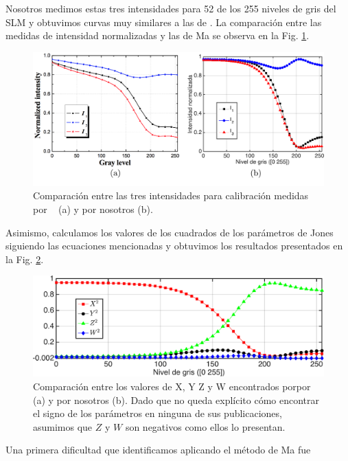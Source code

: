 Nosotros medimos estas tres intensidades para 52 de los 255 niveles de
gris del SLM y obtuvimos curvas muy similares a las de . La
comparación entre las medidas de intensidad normalizadas y las de Ma se observa en la
Fig. \ref{fig:Ma_and_our_Is}.
\begin{figure}[h!]
\includegraphics[scale = .27]{Ma_and_our_Is.pdf}
\caption[Comparación entre las tres intensidades para calibración
medidas por Ma et al.~ para un SLM similar y por
nosotros.]{Comparación entre las tres intensidades para calibración 
medidas por ~ (a) y por nosotros (b).}
\label{fig:Ma_and_our_Is}
\end{figure}
Asimismo, calculamos los valores de los cuadrados de los parámetros de
Jones siguiendo las ecuaciones mencionadas y obtuvimos los resultados
presentados en la Fig. \ref{fig:Our_Ma_X2Y2Z2W2}. 
\begin{figure}[h!]
\includegraphics[scale = .55]{Our_Ma_X2Y2Z2W2_long.pdf}
\caption[Comparación entre los valores de $X$, $Y$ $Z$ y $W$ encontrados por
Ma et al.~ para un SLM similar y por nosotros.]{Comparación entre los
  valores de X, Y Z y W encontrados porpor ~ 
  (a) y por nosotros (b). Dado que no queda explícito cómo encontrar
  el signo de los parámetros en ninguna de sus publicaciones, asumimos
  que $Z$ y $W$ son negativos como ellos lo presentan.}   
\label{fig:Our_Ma_X2Y2Z2W2}
\end{figure}
Una primera dificultad que identificamos aplicando el método de Ma fue
